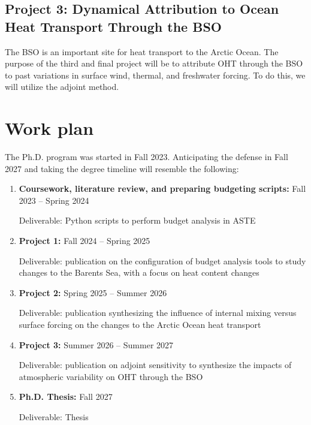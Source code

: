 \documentclass[draft]{agujournal2019}
\begin{document}

\subsection{Project 3: Dynamical Attribution to Ocean Heat Transport Through the BSO}

The BSO is an important site for heat transport to the Arctic Ocean. The purpose of the third and final project will be to attribute OHT through the BSO to past variations in surface wind, thermal, and freshwater forcing. To do this, we will utilize the adjoint method.

\section{Work plan}
    The Ph.D. program was started in Fall 2023. Anticipating the defense in Fall 2027 and taking  the degree timeline will resemble the following:

    \begin{enumerate}
        \item \textbf{Coursework, literature review, and preparing budgeting scripts:} Fall 2023 -- Spring 2024

        Deliverable: Python scripts to perform budget analysis in ASTE
        
        \item \textbf{Project 1:} Fall 2024 -- Spring 2025
        
        Deliverable: publication on the configuration of budget analysis tools to study changes to the Barents Sea, with a focus on heat content changes
        
        \item \textbf{Project 2:} Spring 2025 -- Summer 2026

        Deliverable: publication synthesizing the influence of internal mixing versus surface forcing on the changes to the Arctic Ocean heat transport 

        \item \textbf{Project 3:} Summer 2026 -- Summer 2027

        Deliverable: publication on adjoint sensitivity to synthesize the impacts of atmospheric variability on OHT through the BSO

        \item \textbf{Ph.D. Thesis:} Fall 2027

        Deliverable: Thesis
    \end{enumerate}
\end{document}
